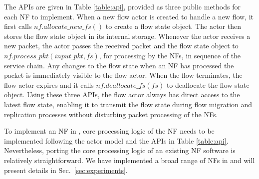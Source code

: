 The APIs are given in Table \ref{table:api}, provided as three public methods for each NF to implement. When a new flow actor is created to handle a new flow, it first calls $nf.allocate\_new\_fs()$ to create a flow state object. The actor then stores the flow state object in its internal storage.
Whenever the actor receives a new packet, the actor passes the received packet and the flow state object to $nf.process\_pkt(input\_pkt, fs)$, for processing by the NFs, in sequence of the service chain. Any changes to the flow state when an NF has processed the packet is immediately visible to the flow actor. When the flow terminates, the flow actor expires and it calls $nf.deallocate\_fs(fs)$ to deallocate the flow state object. Using these three APIs, the flow actor always has direct access to the latest flow state, enabling it to transmit the flow state during flow migration and replication processes without disturbing packet processing of the NFs. %





To implement an NF in \nfactor, core processing logic of the NF needs to be implemented following the actor model and the APIs in Table \ref{table:api}. Nevertheless, porting the core
processing logic of an existing NF software is relatively straightforward. We have implemented a broad range of NFs in \nfactor and will present details in Sec.~\ref{sec:experiments}.


